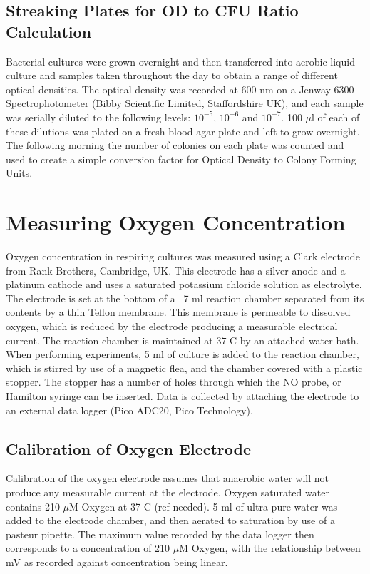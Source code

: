 \subsection{Streaking Plates for OD to CFU Ratio Calculation}
Bacterial cultures were grown overnight and then transferred into aerobic liquid culture and samples taken throughout the day to obtain a range of different optical densities. The optical density was recorded at 600 nm on a Jenway 6300 Spectrophotometer (Bibby Scientific Limited, Staffordshire UK), and each sample was serially diluted to the following levels: $10^{-5}$, $10^{-6}$ and $10^{-7}$. 100 $\mu$l of each of these dilutions was plated on a fresh blood agar plate and left to grow overnight. The following morning the number of colonies on each plate was counted and used to create a simple conversion factor for Optical Density to Colony Forming Units.

\section{Measuring Oxygen Concentration}
Oxygen concentration in respiring cultures was measured using a Clark electrode \cite{Clark1953} from Rank Brothers, Cambridge, UK. This electrode has a silver anode and a platinum cathode and uses a saturated potassium chloride solution as electrolyte. The electrode is set at the bottom of a ~7 ml reaction chamber separated from its contents by a thin Teflon membrane. This membrane is permeable to dissolved oxygen, which is reduced by the electrode producing a measurable electrical current. The reaction chamber is maintained at $37$ \textdegree C by an attached water bath.
When performing experiments, 5 ml of culture is added to the reaction chamber, which is stirred by use of a magnetic flea, and the chamber covered with a plastic stopper. The stopper has a number of holes through which the NO probe, or Hamilton syringe can be inserted. Data is collected by attaching the electrode to an external data logger (Pico ADC20, Pico Technology).

\subsection{Calibration of Oxygen Electrode}
Calibration of the oxygen electrode assumes that anaerobic water will not produce any measurable current at the electrode. Oxygen saturated water contains 210 $\mu$M Oxygen at 37 \textdegree C (ref needed). 5 ml of ultra pure water was added to the electrode chamber, and then aerated to saturation by use of a pasteur pipette. The maximum value recorded by the data logger then corresponds to a concentration of 210 $\mu$M Oxygen, with the relationship between mV as recorded against concentration being linear.

